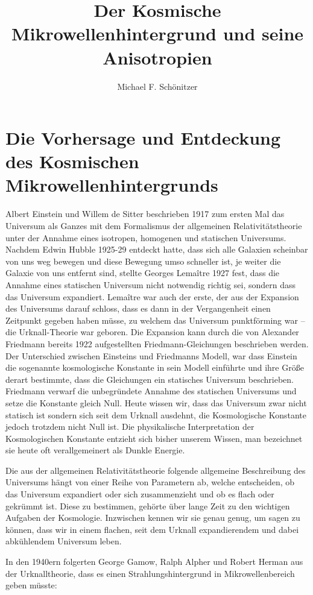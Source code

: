 \documentclass[10pt,a4paper]{article}
\author{Michael F. Schönitzer}
\title{Der Kosmische Mikrowellenhintergrund und seine Anisotropien}
\begin{document}
\maketitle

\section{Die Vorhersage und Entdeckung des Kosmischen Mikrowellenhintergrunds}
Albert Einstein und Willem de Sitter beschrieben 1917 zum ersten Mal das Universum als Ganzes mit dem Formalismus der allgemeinen Relativitätstheorie unter der Annahme eines isotropen, homogenen und statischen Universums.
Nachdem Edwin Hubble 1925-29 entdeckt hatte, dass sich alle Galaxien scheinbar von uns weg bewegen und diese Bewegung umso schneller ist, je weiter die Galaxie von uns entfernt sind, stellte Georges Lemaître 1927 fest, dass die Annahme eines statischen Universum nicht notwendig richtig sei, sondern dass das Universum expandiert. Lemaître war auch der erste, der aus der Expansion des Universums darauf schloss, dass es dann in der Vergangenheit einen Zeitpunkt gegeben haben müsse, zu welchem das Universum punktförming war -- die Urknall-Theorie war geboren.
Die Expansion kann durch die von Alexander Friedmann bereits 1922 aufgestellten Friedmann-Gleichungen beschrieben werden.
Der Unterschied zwischen Einsteins und Friedmanns Modell, war dass Einstein die sogenannte kosmologische Konstante in sein Modell einführte und ihre Größe derart bestimmte, dass die Gleichungen ein statisches Universum beschrieben. Friedmann verwarf die unbegründete Annahme des statischen Universums und setze die Konstante gleich Null.
Heute wissen wir, dass das Universum zwar nicht statisch ist sondern sich seit dem Urknall ausdehnt, die Kosmologische Konstante jedoch trotzdem nicht Null ist.
Die physikalische Interpretation der Kosmologischen Konstante entzieht sich bisher unserem Wissen, man bezeichnet sie heute oft verallgemeinert als Dunkle Energie.

Die aus der allgemeinen Relativitätstheorie folgende allgemeine Beschreibung des Universums hängt von einer Reihe von Parametern ab, welche entscheiden, ob das Universum expandiert oder sich zusammenzieht und ob es flach oder gekrümmt ist. Diese zu bestimmen, gehörte über lange Zeit zu den wichtigen Aufgaben der Kosmologie. Inzwischen kennen wir sie genau genug, um sagen zu können, dass wir in einem flachen, seit dem Urknall expandierendem und dabei abkühlendem Universum leben.

In den 1940ern folgerten George Gamow, Ralph Alpher und Robert Herman aus der Urknalltheorie, dass es einen Strahlungshintergrund in Mikrowellenbereich geben müsste\cite{S+W00}:
\end{document}
